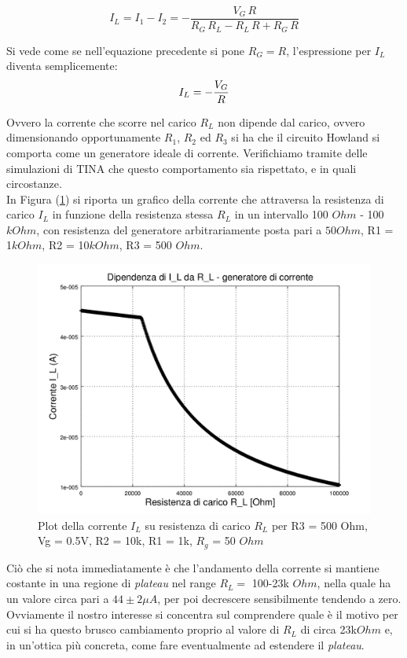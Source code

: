\documentclass[journal, a4paper]{IEEEtran}
\begin{document}
\begin{equation}
I_L = I_1 - I_2 = - \frac{V_G\,R}{R_G\,R_L -R_L\,R + R_G\,R}
\end{equation}

Si vede come se nell'equazione precedente si pone $R_G=R$, l'espressione per $I_L$ diventa semplicemente:
\begin{equation}{\label{corr_carico}}
I_L = - \frac{V_G}{R}
\end{equation}

Ovvero la corrente che scorre nel carico $R_L$ non dipende dal carico, ovvero dimensionando opportunamente $R_1$, $R_2$ ed $R_3$ si  ha che il circuito Howland si comporta come un generatore ideale di corrente. Verifichiamo tramite delle simulazioni di TINA che questo comportamento sia rispettato, e in quali circostanze.\\
In Figura (\ref{fig:corrente_carico_res_carico_R3_500}) si riporta un grafico della corrente che attraversa la resistenza di carico $I_L$ in funzione della resistenza stessa $R_L$ in un intervallo 100 $\si{Ohm}$ - 100 $\si{kOhm}$, con resistenza del generatore arbitrariamente posta pari a $50 \si{Ohm}$, R1 = 1$\si{kOhm}$, R2 = 10$\si{kOhm}$, R3 = 500 $\si{Ohm}$.\\

\begin{figure}
\centering
\includegraphics[width=0.7\linewidth]{./corrente_carico_res_carico_R3_500}
\caption{Plot della corrente $I_L$ su resistenza di carico $R_L$ per R3 = 500 Ohm, Vg = 0.5V, R2 = 10k, R1 = 1k, $R_g$ = 50 $\si{Ohm}$}
\label{fig:corrente_carico_res_carico_R3_500}
\end{figure}

Ciò che si nota immediatamente è che l'andamento della corrente si mantiene costante in una regione di \textit{plateau} nel range $R_L = $ 100-23k $\si{Ohm}$, nella quale ha un valore circa pari a $44 \pm 2 \mu \si{A}$, per poi decrescere sensibilmente tendendo a zero.\\
Ovviamente il nostro interesse si concentra sul comprendere quale è il motivo per cui si ha questo brusco cambiamento proprio al valore di $R_L$ di circa 23k$\si{Ohm}$ e, in un'ottica più concreta, come fare eventualmente ad estendere il \textit{plateau}.\\
\end{document}
